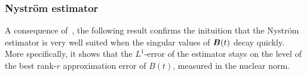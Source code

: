 %
%
%
\subsubsection{Nyström estimator}
\label{subsec:nystrom}

A consequence of~\cite{kressner-2024-randomized-lowrank}, the following result confirms the inituition that the Nystr\"om estimator is very well suited when the singular values of $\boldsymbol{B}(t)$ decay quickly. More specifically, it shows that the $L^1$-error of the estimator stays on the level of the best rank-$r$ approximation error of $B(t)$, measured in the nuclear norm.

